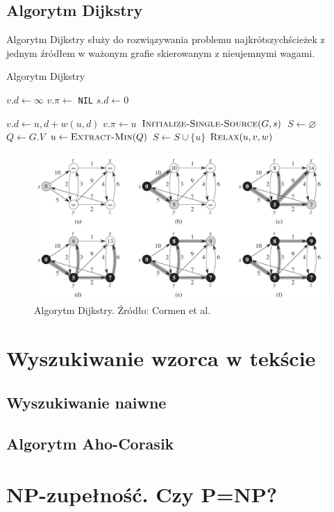 \documentclass[10pt, oneside]{article}
\theoremstyle{remark}
\newcommand{\algcost}[2]{\strut\hfill\makebox[1.5cm][l]{#1}\makebox[4cm][l]{#2}}
\begin{document}
\subsection{Algorytm Dijkstry}
Algorytm Dijkstry służy do rozwiązywania problemu najkrótszychścieżek z jednym źródłem w ważonym grafie skierowanym z nieujemnymi wagami.
\begin{algorithm}
    \caption{Algorytm Dijkstry}
    \label{alg:dijkstra}
    \begin{algorithmic}[1] %
         \algcost{}{// $\Theta(|V|)$}
            		\State $v.d \gets \infty$
            		\State $v.\pi \gets$ \texttt{NIL} 
            	\EndFor
            	\State $s.d \gets 0$
        \EndFunction
         \algcost{}{// $\Theta(1)$}
            		\State $v.d \gets u,d + w(u, d)$
            		\State $v.\pi \gets u$ 
            	\EndIf
        \EndFunction
        		\State $\Call{Initialize-Single-Source}{G, s}$
        		\State $S \gets \varnothing$
            	\State $Q \gets G.V$
        			\State $u \gets \Call{Extract-Min}{Q}$
        			\State $S \gets S \cup \{u\}$
        				\State $\Call{Relax}{u, v, w}$
        			\EndFor
            	\EndWhile
        \EndFunction
    \end{algorithmic}
\end{algorithm}

\begin{figure}[htpb]
	\centering
	\includegraphics[width=.9\textwidth]{figures/dijkstra}
	\caption{Algorytm Dijkstry. Źródło: Cormen et al.}
\end{figure}

\section{Wyszukiwanie wzorca w tekście}

\subsection{Wyszukiwanie naiwne}

\subsection{Algorytm Aho-Corasik}

\section{NP-zupełność. Czy P=NP?}
\end{document}
